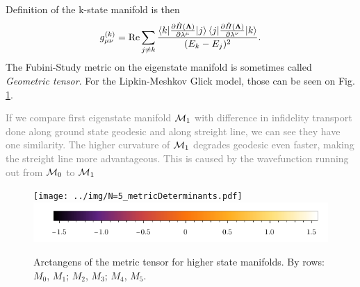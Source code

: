 Definition of the k-state manifold is then
\begin{equation}
    g_{\mu\nu}^{(k)} = \text{Re} \sum_{j\neq k}\frac{\braket{k|\frac{\partial \hat{H}({\bm\Lambda})}{\partial \lambda^\mu}|j}\braket{j|\frac{\partial \hat{H}({\bm\Lambda})}{\partial \lambda^\nu}|k}}{(E_k-E_j)^2}.
    \label{eq:metrictensork}
\end{equation}
The Fubini-Study metric on the eigenstate manifold is sometimes called \emph{Geometric tensor}. For the Lipkin-Meshkov Glick model, those can be seen on Fig. \ref{fig:higherStateManifolds}.


\textcolor{gray}{If we compare first eigenstate manifold $\mathcal{M}_1$ with difference in infidelity transport done along ground state geodesic and along streight line, we can see they have one similarity. The higher curvature of $\mathcal{M}_1$ degrades geodesic even faster, making the streight line more advantageous. This is caused by the wavefunction running out from $\mathcal{M}_0$ to $\mathcal{M}_1$}




\begin{figure}[H]
    \centering
    \texttt{[image: ../img/N=5\_metricDeterminants.pdf]}
    \includegraphics[scale=1.2]{../img/N=3_barA.pdf}
    \caption{Arctangens of the metric tensor for higher state manifolds. By  rows: $M_0$, $M_1$; $M_2$, $M_3$; $M_4$, $M_5$.}
    \label{fig:higherStateManifolds}    
\end{figure}


